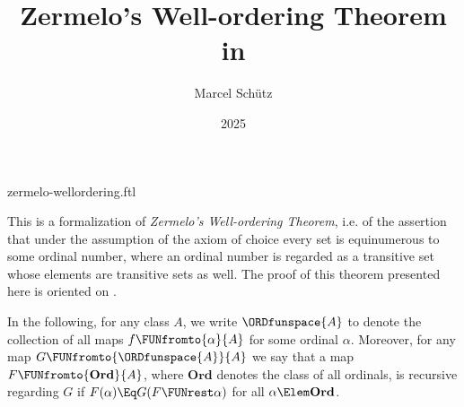 \documentclass{stex}
\title{Zermelo's Well-ordering Theorem in \Naproche}
\author{Marcel Schütz}
\date{2025}
\newcommand\Ord{\textbf{Ord}}
\begin{document}
\begin{smodule}{zermelo-wellordering.ftl}
\maketitle



\noindent This is a formalization of \textit{Zermelo's Well-ordering Theorem},
i.e. of the assertion that under the assumption of the axiom of choice every
set is equinumerous to some ordinal number, where an ordinal number is
regarded as a transitive set whose elements are transitive sets as well.
The proof of this theorem presented here is oriented on \cite{Koepke2018}.

In the following, for any class $A$, we write $\ORDfunspace{A}$ to
denote the collection of all maps $f \FUNfromto{\alpha}{A}$ for some ordinal
$\alpha$.
Moreover, for any map $G \FUNfromto{\ORDfunspace{A}}{A}$ we say that a map
$F \FUNfromto{\Ord}{A}$, where $\Ord$ denotes the class of all ordinals, is
recursive regarding $G$ if $F(\alpha) \Eq G(F \FUNrest \alpha)$ for all
$\alpha \Elem \Ord$.


\end{smodule}
\end{document}
